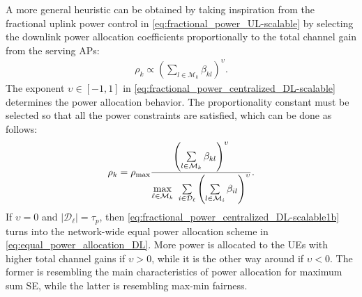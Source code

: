 A more general heuristic can be obtained by taking inspiration from the fractional uplink power control in  \eqref{eq:fractional_power_UL-scalable} by selecting the downlink power allocation coefficients proportionally to the total channel gain from the serving APs: 
\begin{align}\label{eq:fractional_power_centralized_DL-scalable}
\rho_k\propto \left(\sum\limits_{l\in\mathcal{M}_k}\beta_{kl}\right)^{\upsilon}.
\end{align}
The exponent $\upsilon \in [-1,1]$ in \eqref{eq:fractional_power_centralized_DL-scalable} determines the power allocation behavior. The proportionality constant must be selected so that all the power constraints are satisfied, which can be done as follows:
\begin{align}\label{eq:fractional_power_centralized_DL-scalable1b}
\rho_k=\rho_{\textrm{max}} \frac{\left(\sum\limits_{l\in\mathcal{M}_k}\beta_{kl}\right)^{\upsilon}}{\underset{\ell\in \mathcal{M}_k}{\max} \  \sum\limits_{i\in \mathcal{D}_{\ell}}   \left(\sum\limits_{l\in\mathcal{M}_i}\beta_{il}\right)^{\upsilon}}.
\end{align}
If $\upsilon=0$ and $|\mathcal{D}_{\ell}| = \tau_p$, then \eqref{eq:fractional_power_centralized_DL-scalable1b} turns into the network-wide equal power allocation scheme in \eqref{eq:equal_power_allocation_DL}.
 More power is allocated to the UEs with higher total channel gains if $\upsilon>0$, while it is the other way around if $\upsilon<0$. 
 The former is resembling the main characteristics of power allocation for maximum sum SE, while the latter is resembling max-min fairness.
 
